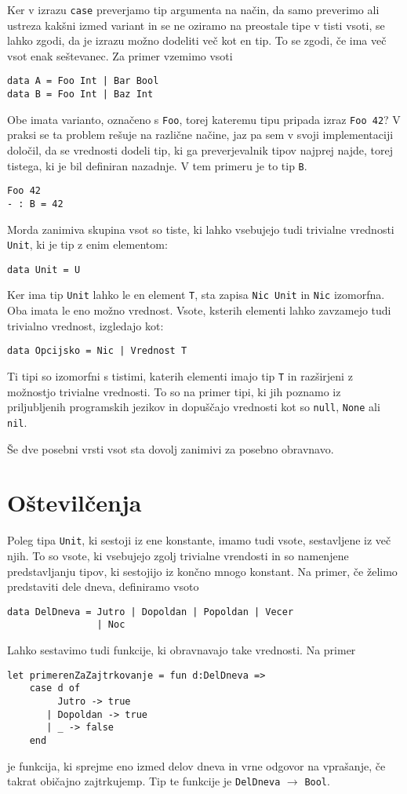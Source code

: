 \documentclass[12pt,a4paper,openany]{book}
\begin{document}
Ker v izrazu \lstinline{case} preverjamo tip argumenta na način, da samo preverimo ali ustreza kakšni izmed variant in se ne oziramo na preostale tipe v tisti vsoti, 
se lahko zgodi, da je izrazu možno dodeliti več kot en tip. To se zgodi, če ima več vsot enak seštevanec. Za primer vzemimo vsoti
\begin{lstlisting}
data A = Foo Int | Bar Bool
data B = Foo Int | Baz Int
\end{lstlisting}
Obe imata varianto, označeno s \lstinline{Foo}, torej kateremu tipu pripada izraz \lstinline{Foo 42}? V praksi se ta problem rešuje na različne načine, jaz pa sem v svoji implementaciji določil, da se vrednosti 
dodeli tip, ki ga preverjevalnik tipov najprej najde, torej tistega, ki je bil definiran nazadnje. V tem primeru je to tip \lstinline{B}.
\begin{lstlisting}
Foo 42
- : B = 42
\end{lstlisting}

Morda zanimiva skupina vsot so tiste, ki lahko vsebujejo tudi trivialne vrednosti \lstinline{Unit}, ki je tip z enim elementom:
\begin{lstlisting}
data Unit = U
\end{lstlisting}
Ker ima tip \lstinline{Unit} lahko le en element \lstinline{T}, sta zapisa \lstinline{Nic Unit} in \lstinline{Nic} izomorfna. Oba imata le eno možno vrednost. Vsote, ksterih elementi lahko zavzamejo tudi trivialno vrednost, izgledajo kot:
\begin{lstlisting}
data Opcijsko = Nic | Vrednost T
\end{lstlisting}
Ti tipi so izomorfni s tistimi, katerih elementi imajo tip \lstinline{T} in razširjeni z možnostjo trivialne vrednosti. To so na primer tipi, ki jih poznamo iz priljubljenih programskih jezikov in dopuščajo 
vrednosti kot so \lstinline{null}, \lstinline{None} ali \lstinline{nil}.

Še dve posebni vrsti vsot sta dovolj zanimivi za posebno obravnavo.

\section{Oštevilčenja}
Poleg tipa \lstinline{Unit}, ki sestoji iz ene konstante, imamo tudi vsote, sestavljene iz več njih. To so vsote, ki vsebujejo zgolj trivialne vrendosti in so namenjene predstavljanju tipov, ki sestojijo iz končno mnogo konstant. 
Na primer, če želimo predstaviti dele dneva, definiramo vsoto
\begin{lstlisting}
data DelDneva = Jutro | Dopoldan | Popoldan | Vecer 
                | Noc
\end{lstlisting}
Lahko sestavimo tudi funkcije, ki obravnavajo take vrednosti. Na primer
\begin{lstlisting}
let primerenZaZajtrkovanje = fun d:DelDneva =>
    case d of 
         Jutro -> true
       | Dopoldan -> true
       | _ -> false
    end
\end{lstlisting}
je funkcija, ki sprejme eno izmed delov dneva in vrne odgovor na vprašanje, če takrat običajno zajtrkujemp. Tip te funkcije je \lstinline{DelDneva} $\rightarrow$ \lstinline{Bool}.
\end{document}
